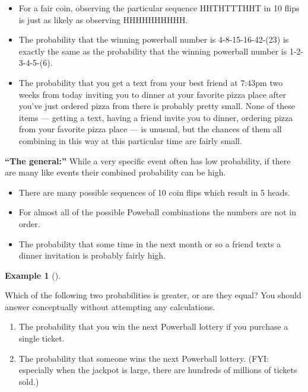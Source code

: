 \documentclass[
  letterpaper,
  DIV=11,
  numbers=noendperiod]{scrreprt}
\providecommand{\tightlist}{%
  \setlength{\itemsep}{0pt}\setlength{\parskip}{0pt}}
\theoremstyle{plain}
\theoremstyle{definition}
\newtheorem{example}{Example}[chapter]
\theoremstyle{definition}
\theoremstyle{definition}
\theoremstyle{remark}
\begin{document}
\begin{itemize}
\tightlist
\item
  For a fair coin, observing the particular sequence HHTHTTTHHT in 10
  flips is just as likely as observing HHHHHHHHHH.
\item
  The probability that the winning powerball number is 4-8-15-16-42-(23)
  is exactly the same as the probability that the winning powerball
  number is 1-2-3-4-5-(6).\\
\item
  The probability that you get a text from your best friend at 7:43pm
  two weeks from today inviting you to dinner at your favorite pizza
  place after you've just ordered pizza from there is probably pretty
  small. None of these items --- getting a text, having a friend invite
  you to dinner, ordering pizza from your favorite pizza place --- is
  unusual, but the chances of them all combining in this way at this
  particular time are fairly small.
\end{itemize}

\textbf{``The general:''} While a very specific event often has low
probability, if there are many like events their combined probability
can be high.

\begin{itemize}
\tightlist
\item
  There are many possible sequences of 10 coin flips which result in 5
  heads.
\item
  For almost all of the possible Poweball combinations the numbers are
  not in order.
\item
  The probability that some time in the next month or so a friend texts
  a dinner invitation is probably fairly high.
\end{itemize}

\begin{tcolorbox}[enhanced jigsaw, opacityback=0, left=2mm, colframe=quarto-callout-note-color-frame, toprule=.15mm, breakable, colback=white, leftrule=.75mm, arc=.35mm, rightrule=.15mm, bottomrule=.15mm]

\begin{example}[]\protect\hypertarget{exm-probability-interpret3}{}\label{exm-probability-interpret3}

Which of the following two probabilities is greater, or are they equal?
You should answer conceptually without attempting any calculations.

\begin{enumerate}
\def\labelenumi{\arabic{enumi}.}
\tightlist
\item
  The probability that you win the next Powerball lottery if you
  purchase a single ticket.
\item
  The probability that someone wins the next Powerball lottery. (FYI:
  especially when the jackpot is large, there are hundreds of millions
  of tickets sold.)
\end{enumerate}

\end{example}

\end{tcolorbox}
\end{document}

